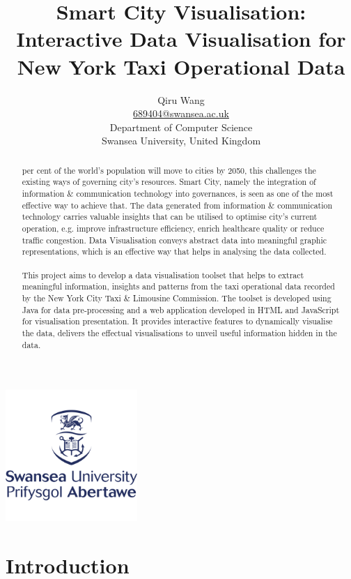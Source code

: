 \documentclass[11pt,a4paper]{article}
\title{Smart City Visualisation: Interactive Data Visualisation for New York Taxi Operational Data}
\author{Qiru Wang\\
\href{mailto:689404@swansea.ac.uk}{689404@swansea.ac.uk}\\
Department of Computer Science\\
Swansea University, United Kingdom}
\date{}
\begin{document}
\maketitle
\begin{abstract}
	 per cent of the world's population will move to cities by 2050, this challenges the existing ways of governing city's resources. Smart City, namely the integration of information \& communication technology into governances, is seen as one of the most effective way to achieve that. The data generated from information \& communication technology carries valuable insights that can be utilised to optimise city's current operation, e.g. improve infrastructure efficiency, enrich healthcare quality or reduce traffic congestion. Data Visualisation conveys abstract data into meaningful graphic representations, which is an effective way that helps in analysing the data collected. \\\\
	This project aims to develop a data visualisation toolset that helps to extract meaningful information, insights and patterns from the taxi operational data recorded by the New York City Taxi \& Limousine Commission. The toolset is developed using Java for data pre-processing and a web application developed in HTML and JavaScript for visualisation presentation. It provides interactive features to dynamically visualise the data, delivers the effectual visualisations to unveil useful information hidden in the data.
\end{abstract}

\begin{center}
	\includegraphics[height=5cm,keepaspectratio]{figures/logo.png}
\end{center}
\newpage
\tableofcontents
\newpage
\setcounter{secnumdepth}{5}
\section{Introduction}
\end{document}
